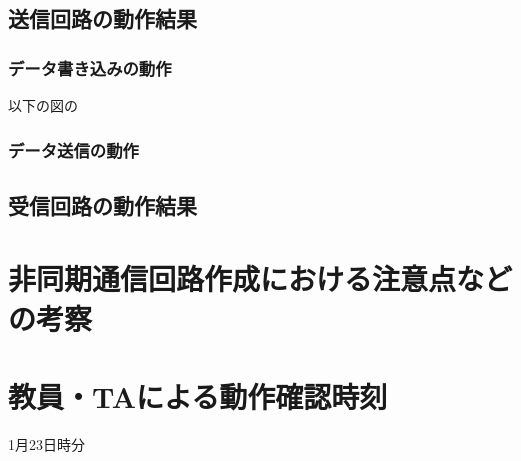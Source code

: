 \documentclass[dvipdfmx]{jarticle}
\begin{document}
\subsection{送信回路の動作結果}
\subsubsection{データ書き込みの動作}
以下の図の
\subsubsection{データ送信の動作}
\subsection{受信回路の動作結果}
\section{非同期通信回路作成における注意点などの考察}
\section{教員・TAによる動作確認時刻}
1月23日時分
\end{document}
